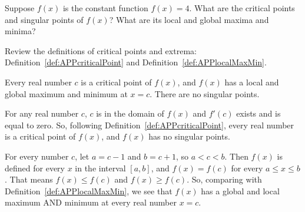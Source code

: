 \begin{question}
Suppose $f(x)$ is the constant function $f(x)=4$. What are the critical points and singular points of $f(x)$? What are its local and global maxima and minima?
\end{question}
\begin{hint}
Review the definitions of critical points and extrema: Definition~\ref*{def:APPcriticalPoint}
and
Definition~\ref*{def:APPlocalMaxMin}.
\end{hint}
\begin{answer}
Every real number $c$ is a critical point of $f(x)$, and $f(x)$ has a local and global maximum and minimum at $x=c$. There are no singular points.
\end{answer}
\begin{solution}
For any real number $c$, $c$ is in the domain of $f(x)$ and $f'(c)$ exists and is equal to zero. So, following
Definition~\ref*{def:APPcriticalPoint}, every real number is  a critical point of $f(x)$, and $f(x)$ has no singular points.

For every number $c$, let $a=c-1$ and $b=c+1$, so $a<c<b$. Then $f(x)$ is defined for every $x$ in the interval $[a,b]$, and
$f(x) =f(c)$ for every $a \le x \le b$. That means $f(x) \leq f(c)$ and $f(x) \geq f(c)$. So, comparing with Definition~\ref*{def:APPlocalMaxMin}, we see that $f(x)$ has a global and local maximum AND minimum at every real number $x=c$.
\end{solution}
